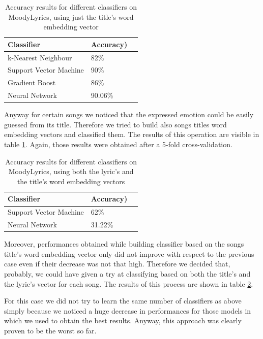 \begin{table}[]
\centering
\begin{tabular}{@{}lll@{}}
\toprule
\textbf{Classifier} & \textbf{Accuracy})   \\ \midrule
k-Nearest Neighbour & 82\%  \\
Support Vector Machine & 90\%  \\
Gradient Boost & 86\%  \\
Neural Network & 90.06\%  \\
\end{tabular}
\caption{Accuracy results for different classifiers on MoodyLyrics, using just the title's word embedding vector}
\label{table:ml-simple-results-title}
\end{table}

Anyway for certain songs we noticed that the expressed emotion could be easily guessed from its title. Therefore
we tried to build also songs titles word embedding vectors and classified them. The results of this operation are 
visible in table \ref{table:ml-simple-results-title}. Again, those results were obtained after a 5-fold cross-validation. 

\begin{table}[]
\centering
\begin{tabular}{@{}lll@{}}
\toprule
\textbf{Classifier} & \textbf{Accuracy})   \\ \midrule
Support Vector Machine & 62\%  \\
Neural Network & 31.22\%  \\
\end{tabular}
\caption{Accuracy results for different classifiers on MoodyLyrics, using both the lyric's and the title's word embedding vectors}
\label{table:ml-simple-results-both}
\end{table}

Moreover, performances obtained while building classifier based on the songs title's word embedding vector only
did not improve with respect to the previous case even if their decrease was not that high. Therefore we decided
that, probably, we could have given a try at classifying based on both the title's and the lyric's vector for each
song. The results of this process are shown in table \ref{table:ml-simple-results-both}.

For this case we did not try to learn the same number of classifiers as above simply because we noticed a huge decrease
in performances for those models in which we used to obtain the best results. Anyway, this approach was clearly proven to be
the worst so far.

